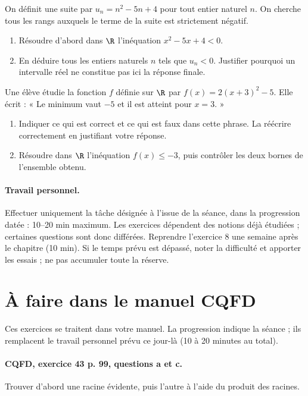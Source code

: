 On définit une suite par $u_n=n^2-5n+4$ pour tout entier naturel $n$. On cherche tous les rangs auxquels le terme de la suite est strictement négatif.
\begin{enumerate}[label=\arabic*.]
\item Résoudre d’abord dans $\R$ l’inéquation $x^2-5x+4<0$.
\item En déduire tous les entiers naturels $n$ tels que $u_n<0$. Justifier pourquoi un intervalle réel ne constitue pas ici la réponse finale.
\end{enumerate}
Une élève étudie la fonction $f$ définie sur $\R$ par $f(x)=2(x+3)^2-5$. Elle écrit : « Le minimum vaut $-5$ et il est atteint pour $x=3$. »
\begin{enumerate}[label=\arabic*.]
\item Indiquer ce qui est correct et ce qui est faux dans cette phrase. La réécrire correctement en justifiant votre réponse.
\item Résoudre dans $\R$ l’inéquation $f(x)\leq-3$, puis contrôler les deux bornes de l’ensemble obtenu.
\end{enumerate}
\paragraph{Travail personnel.} Effectuer uniquement la tâche désignée à l’issue de la séance, dans la progression datée : 10–20 min maximum. Les exercices dépendent des notions déjà étudiées ; certaines questions sont donc différées. Reprendre l’exercice 8 une semaine après le chapitre (10 min). Si le temps prévu est dépassé, noter la difficulté et apporter les essais ; ne pas accumuler toute la réserve.
\endgroup
{}\section*{À faire dans le manuel CQFD}
Ces exercices se traitent dans votre manuel. La progression indique la séance ; ils remplacent le travail personnel prévu ce jour-là (10 à 20 minutes au total).
\paragraph{CQFD, exercice 43 p. 99, questions a et c.}\label{C02-M1} Trouver d’abord une racine évidente, puis l’autre à l’aide du produit des racines.
